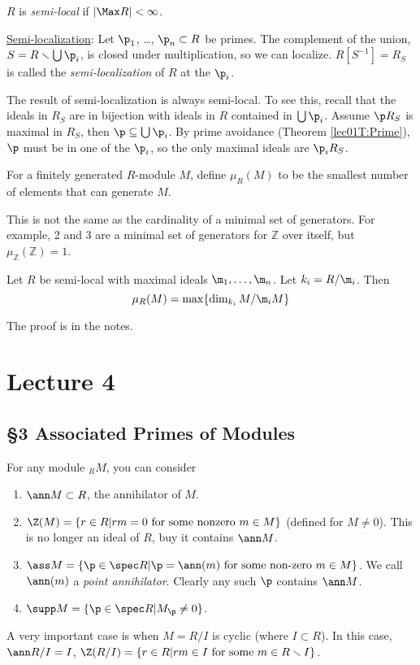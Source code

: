  \begin{definition}
   $R$ is \emph{semi-local} if $|\Max R|<\infty$.
 \end{definition}
 \underline{Semi-localization}: Let $\p_1$, \dots, $\p_n\subset R$ be primes. The complement of
 the union, $S=R\smallsetminus \bigcup \p_i$, is closed under multiplication, so we can
 localize. $R[S^{-1}] = R_S$ is called the \emph{semi-localization}
  of $R$ at the $\p_i$.

 The result of semi-localization is always semi-local. To see this, recall that the ideals
 in $R_S$ are in bijection with ideals in $R$ contained in $\bigcup \p_i$. Assume $\p
 R_S$ is maximal in $R_S$, then $\p\subseteq \bigcup \p_i$. By prime avoidance (Theorem
 \ref{lec01T:Prime}), $\p$ must be in one of the $\p_i$, so the only maximal ideals are
 $\p_i R_S$.

 \begin{definition}
   For a finitely generated $R$-module $M$, define $\mu_R(M)$ to be the smallest number
   of elements that can generate $M$.
 \end{definition}
 This is not the same as the cardinality of a minimal set of generators. For example, 2
 and 3 are a minimal set of generators for $\mathbb{Z}$ over itself, but $\mu_\mathbb{Z} (\mathbb{Z}) =1$.

 \begin{theorem}
   Let $R$ be semi-local with maximal ideals $\m_1,\dots, \m_n$. Let $k_i = R/\m_i$. Then
   \[
     \mu_R(M) = \max \{\dim_{k_i} M/\m_i M\}
   \]
 \end{theorem}
 The proof is in the notes. 
 \setcounter{lecture}{4}
 \section{Lecture 4}

 \subsection{\S 3 Associated Primes of Modules}

 For any module ${}_R M$, you can consider
 \begin{enumerate}
   \item $\ann M\subset R$, the annihilator of $M$.

   \item $\Z(M) = \{r\in R|rm=0\text{ for some nonzero }m\in M\}$ (defined for $M\neq
       0$). This is no longer an ideal of $R$, buy it contains $\ann M$.

   \item $\ass M = \{\p\in \spec R| \p = \ann(m)\text{ for some non-zero }m\in M\}$. We
   call $\ann (m)$ a \emph{point annihilator}. Clearly any such $\p$ contains $\ann M$.

   \item $\supp M = \{\p\in \spec R| M_\p\neq 0\}$.
 \end{enumerate}
 A very important case is when $M=R/I$ is cyclic (where $I\subset R$). In this case, $\ann R/I
 = I$, $\Z(R/I) = \{r\in R|rm\in I\text{ for some }m\in R\smallsetminus I\}$.

